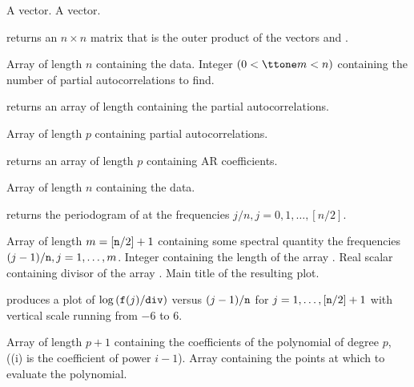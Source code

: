 
\Sarg
{} A vector.
 A vector.

\Sval
\Sitem{ }  returns an $n\times n$ matrix that is the outer product
of the vectors {} and {}.
%
%


\Sarg
{} Array of length $n$ containing the data.
 Integer $(0<{\tsl{m}}<n)$ containing the number of partial 
autocorrelations to find.

\Sval
\Sitem{ }  returns an array of length {} 
containing the partial autocorrelations.
%
%


\Sarg
{} Array of length $p$ containing partial autocorrelations.

\Sval
\Sitem{ }  returns an array of length $p$ containing 
AR coefficients.
%
%


\Sarg
{} Array of length $n$ containing the data.

\Sval
\Sitem{ }  returns the periodogram of {} at 
the frequencies $j/n,j=0,1,\ldots,[n/2]$.
%
%


\Sarg
{} Array of length $m=[{\tt{n}}/2]+1$ containing some spectral 
quantity the frequencies $(j-1)/{\tt{n}},j=1,\ldots,m$.
 Integer containing the length of the array {}.
 Real scalar containing divisor of the array {}.
 Main title of the resulting plot.

\Sval
\Sitem{ }  produces a plot of $\log{({\tt{f}}(j)/{\tt{div}})}$
versus $(j-1)/{\tt{n}}$ for $j=1,\ldots,[{\tt{n}}/2]+1$ with vertical 
scale running from $-6$ to 6.
%
%


\Sarg
{} Array of length $p+1$ containing the coefficients of the 
polynomial of degree $p$, ({}(i) is the coefficient of power
$i-1$).
 Array containing the points at which to evaluate the polynomial.

